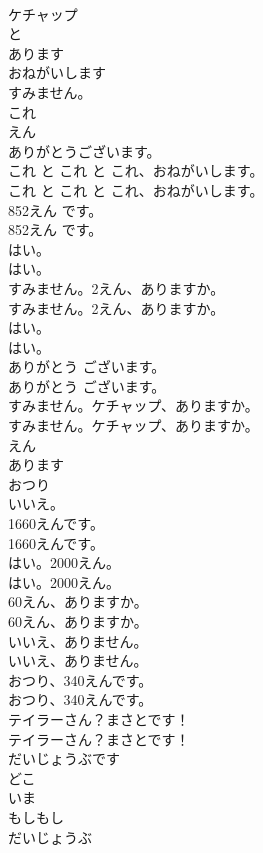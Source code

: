 \documentclass[8pt]{extreport}
\begin{document}
\begin{CJK}{UTF8}{min}
\\	ケチャップ
\\	と
\\	あります
\\	おねがいします
\\	すみません。
\\	これ
\\	えん
\\	ありがとうございます。
\\	これ と これ と これ、おねがいします。	
\\	これ と これ と これ、おねがいします。 
\\	852えん です。	
\\	852えん です。 
\\	はい。	
\\	はい。 
\\	すみません。2えん、ありますか。	
\\	すみません。2えん、ありますか。 
\\	はい。	
\\	はい。 
\\	ありがとう ございます。	
\\	ありがとう ございます。 
\\	すみません。ケチャップ、ありますか。	
\\	すみません。ケチャップ、ありますか。 
\\	えん
\\	あります
\\	おつり
\\	いいえ。
\\	1660えんです。	
\\	1660えんです。 
\\	はい。2000えん。	
\\	はい。2000えん。 
\\	60えん、ありますか。	
\\	60えん、ありますか。 
\\	いいえ、ありません。	
\\	いいえ、ありません。 
\\	おつり、340えんです。	
\\	おつり、340えんです。 
\\	テイラーさん？まさとです！	
\\	テイラーさん？まさとです！ 
\\	だいじょうぶです
\\	どこ
\\	いま
\\	もしもし
\\	だいじょうぶ

\end{CJK}
\end{document}
